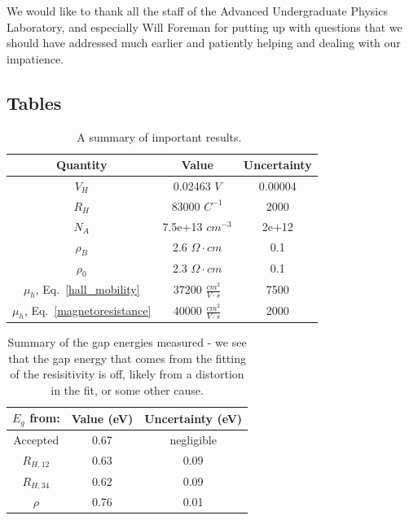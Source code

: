 \documentclass[reprint, nobibnotes, amssymb, amsmath, amsfonts, physics, mathtools, mathrsfs, floatfix]{revtex4-1}
\begin{document}
    We would like to thank all the staff of the Advanced Undergraduate Physics Laboratory, and especially Will Foreman for putting up with questions that we should have addressed much earlier and patiently helping and dealing with our impatience.

    \subsection{Tables}

    \begin{table}[h]
      \begin{tabular}{|c|c|c|}
        \hline
        Quantity & Value & Uncertainty \\ \hline
        $V_H$ & 0.02463 $V$ & 0.00004 \\ \hline
        $R_H$ & 83000 $C^{-1}$ & 2000 \\ \hline
        $N_A$ &  7.5e+13 $cm^{-3}$ & 2e+12 \\ \hline
        $\rho_B$ & 2.6 $\Omega \cdot cm$ & 0.1 \\ \hline
        $\rho_0$ & 2.3 $\Omega \cdot cm$ & 0.1 \\ \hline
        $\mu_h$, Eq.~\ref{hall_mobility} & 37200 $\frac{cm^2}{V\cdot s}$ & 7500 \\ \hline
        $\mu_h$, Eq.~\ref{magnetoresistance} & 40000 $\frac{cm^2}{V\cdot s}$ & 2000 \\ \hline
      \end{tabular}
      \caption{A summary of important results.~\label{tab:results}}
    \end{table}

    \begin{table}[h]
      \begin{tabular}{|c|c|c|}
        \hline
        $E_g$ from: & Value (eV) & Uncertainty (eV) \\ \hline
        Accepted & 0.67 & negligible \\ \hline
        $R_{H, 12}$ & 0.63 & 0.09 \\ \hline
        $R_{H, 34}$ & 0.62 & 0.09 \\ \hline
        $\rho$ & 0.76 & 0.01 \\ \hline
      \end{tabular}
      \caption{Summary of the gap energies measured - we see that the gap energy that comes from the fitting of the resisitivity is off, likely from a distortion in the fit, or some other cause. \label{tab:eg}}
    \end{table}
\end{document}
